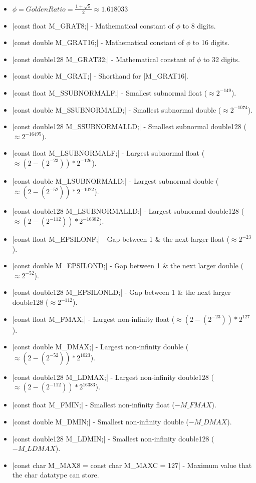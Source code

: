 \documentclass[12pt, letterpaper, oneside]{article}
\begin{document}
\begin{itemize}
		\newline
		\item[--] $\phi = Golden Ratio = \frac{1 + \sqrt{5}}{2} \approx 1.618033$
		\item[--] \spverb|const float M_GRAT8;| - Mathematical constant of $\phi$ to 8 digits.
		\item[--] \spverb|const double M_GRAT16;| - Mathematical constant of $\phi$ to 16 digits.
		\item[--] \spverb|const double128 M_GRAT32;| - Mathematical constant of $\phi$ to 32 digits.
		\item[--] \spverb|const double M_GRAT;| - Shorthand for \spverb|M_GRAT16|.
		\newline
		\item[--] \spverb|const float M_SSUBNORMALF;| - Smallest subnormal float ($\approx {2}^{-149}$).
		\item[--] \spverb|const double M_SSUBNORMALD;| - Smallest subnormal double ($\approx {2}^{-1074}$).
		\item[--] \spverb|const double128 M_SSUBNORMALLD;| - Smallest subnormal double128 ($\approx {2}^{-16495}$).
		\newline
		\item[--] \spverb|const float M_LSUBNORMALF;| - Largest subnormal float ($\approx (2-(2^{-23}))*2^{-126}$).
		\item[--] \spverb|const double M_LSUBNORMALD;| - Largest subnormal double ($\approx (2-(2^{-52}))*2^{-1022}$).
		\item[--] \spverb|const double128 M_LSUBNORMALLD;| - Largest subnormal double128 
		($\approx (2-(2^{-112}))*2^{-16382}$).
		\newline
		\item[--] \spverb|const float M_EPSILONF;| - Gap between 1 \& the next larger float ($\approx 2^{-23}$).
		\item[--] \spverb|const double M_EPSILOND;| - Gap between 1 \& the next larger double ($\approx 2^{-52}$).
		\item[--] \spverb|const double128 M_EPSILONLD;| - Gap between 1 \& the next larger double128 ($\approx
		2^{-112}$).
		\newline
		\item[--] \spverb|const float M_FMAX;| - Largest non-infinity float ($\approx (2-(2^{-23}))*2^{127}$).
		\item[--] \spverb|const double M_DMAX;| - Largest non-infinity double ($\approx (2-(2^{-52}))*2^{1023}$).
		\item[--] \spverb|const double128 M_LDMAX;| - Largest non-infinity double128 
		($\approx (2-(2^{-112}))*2^{16383}$).
		\item[--] \spverb|const float M_FMIN;| - Smallest non-infinity float ($-M\_FMAX$).
		\item[--] \spverb|const double M_DMIN;| - Smallest non-infinity double ($-M\_DMAX$).
		\item[--] \spverb|const double128 M_LDMIN;| - Smallest non-infinity double128 
		($-M\_LDMAX$).
		\item[--] \spverb|const char M_MAX8 = const char M_MAXC = 127| - Maximum value that the char datatype can store.


\end{itemize}
\end{document}
